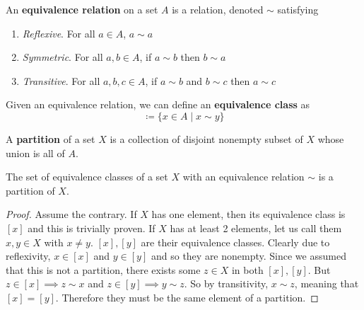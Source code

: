 \documentclass{article}
\begin{document}
    \begin{definition}
      An \textbf{equivalence relation} on a set $A$ is a relation, denoted $\sim$ satisfying 
      \begin{enumerate}
        \item \textit{Reflexive}. For all $a \in A$, $a \sim a$
        \item \textit{Symmetric}. For all $a,b \in A$, if $a \sim b$ then $b \sim a$
        \item \textit{Transitive}. For all $a,b,c \in A$, if $a \sim b$ and $b \sim c$ then $a \sim c$
      \end{enumerate}
      Given an equivalence relation, we can define an \textbf{equivalence class} as 
      \begin{equation}
        [y] \coloneqq \{ x \in A \mid x \sim y \}
      \end{equation}
    \end{definition}

    \begin{definition}[Partition]
      A \textbf{partition} of a set $X$ is a collection of disjoint nonempty subset of $X$ whose union is all of $A$. 
    \end{definition} 

    \begin{theorem}[]
      The set of equivalence classes of a set $X$ with an equivalence relation $\sim$ is a partition of $X$. 
    \end{theorem} 
    \begin{proof}
      Assume the contrary. If $X$ has one element, then its equivalence class is $[x]$ and this is trivially proven. If $X$ has at least 2 elements, let us call them $x, y \in X$ with $x \neq y$. $[x], [y]$ are their equivalence classes. Clearly due to reflexivity, $x \in [x]$ and $y \in [y]$ and so they are nonempty. Since we assumed that this is not a partition, there exists some $z \in X$ in both $[x], [y]$. But $z \in [x] \implies z \sim x$ and $z \in [y] \implies y \sim z$. So by transitivity, $x \sim z$, meaning that $[x] = [y]$. Therefore they must be the same element of a partition. 
    \end{proof}
\end{document}

